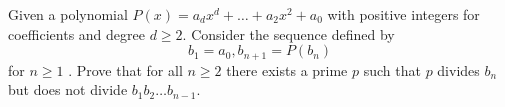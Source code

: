 Given a polynomial $P(x)=a_{d}x^{d}+ \ldots +a_{2}x^{2}+a_{0}$ with positive integers for coefficients and degree $d\geq 2$. Consider the sequence defined by $$b_{1}=a_{0} ,b_{n+1}=P(b_{n}) $$for $n \geq 1$ . Prove that for all $n \geq 2$ there exists a prime $p$ such that $p$ divides $b_{n}$ but does not divide $b_{1}b_{2} \ldots b_{n-1}$.